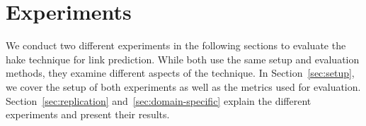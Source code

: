 \section{Experiments}\label{sec:experiments}

We conduct two different experiments in the following sections to evaluate the \ac{hake} technique for link prediction.
While both use the same setup and evaluation methods, they examine different aspects of the technique.
In Section~\ref{sec:setup}, we cover the setup of both experiments as well as the metrics used for evaluation.
Section~\ref{sec:replication} and~\ref{sec:domain-specific} explain the different experiments and present their results.




